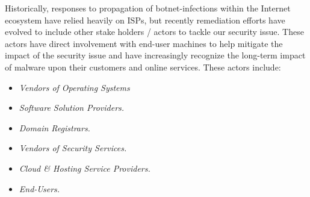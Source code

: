Historically, responses to propagation of botnet-infections within the Internet ecosystem have relied heavily on ISPs, but recently remediation efforts have evolved to include other stake holders / actors to tackle our security issue. These actors have direct involvement with end-user machines to help mitigate the impact of the security issue and have increasingly recognize the long-term impact of malware upon their customers and online services. These actors include: 

\begin{itemize}
\item \textit{Vendors of Operating Systems}
\item \textit{Software Solution Providers.}
\item \textit{Domain Registrars.}
\item \textit{Vendors of Security Services.}
\item \textit{Cloud & Hosting Service Providers.}
\item \textit{End-Users.}
\end{itemize}
